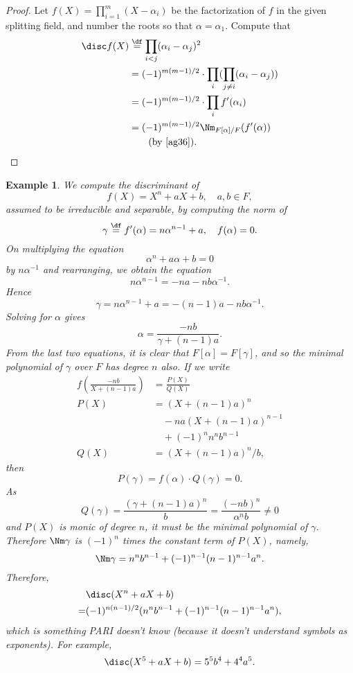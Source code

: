 \documentclass[a4paper,11pt,final,openany]{memoir}
\newtheorem{example}[X]{Example}
\theoremstyle{nonumberplain}
\newtheorem{proof}{Proof.}
\begin{document}
\begin{proof}
Let $f(X)=\prod_{i=1}^{m}(X-\alpha_{i})$ be the factorization of $f$ in the
given splitting field, and number the roots so that $\alpha=\alpha_{1}$.
Compute that
\begin{align*}
\disc f(X)  &  \overset{\df}{=}\prod_{i<j}(\alpha_{i}%
-\alpha_{j})^{2}\\
&  =(-1)^{m(m-1)/2}\cdot\prod_{i}(\prod_{j\neq i}(\alpha_{i}-\alpha_{j}))\\
&  =(-1)^{m(m-1)/2}\cdot\prod_{i}f^{\prime}(\alpha_{i})\\
&  =(-1)^{m(m-1)/2}\Nm_{F[\alpha]/F}(f^{\prime}(\alpha))\\
&\qquad\text{(by
\ref{ag36})}.
\end{align*}

\end{proof}

\begin{example}
\label{ag39}We compute the discriminant of
\[
f(X)=X^{n}+aX+b,\quad a,b\in F,
\]
assumed to be irreducible and separable, by computing the norm of
\[
\gamma\overset{\df}{=}f^{\prime}(\alpha)=n\alpha
^{n-1}+a,\quad f(\alpha)=0\text{.}%
\]
On multiplying the equation
\[
\alpha^{n}+a\alpha+b=0
\]
by $n\alpha^{-1}$ and rearranging, we obtain the equation
\[
n\alpha^{n-1}=-na-nb\alpha^{-1}.
\]
Hence
\[
\gamma=n\alpha^{n-1}+a=-(n-1)a-nb\alpha^{-1}.
\]
Solving for $\alpha$ gives
\[
\alpha=\frac{-nb}{\gamma+(n-1)a}.
\]
From the last two equations, it is clear that $F[\alpha]=F[\gamma]$, and so
the minimal polynomial of $\gamma$ over $F$ has degree $n$ also. If we write
\begin{align*}
f\left(  \frac{-nb}{X+(n-1)a}\right)   &  =\frac{P(X)}{Q(X)}\\
P(X)  &  =(X+(n-1)a)^{n}\\
   &\quad -na(X+(n-1)a)^{n-1}\\
   &\quad +(-1)^{n}n^{n}b^{n-1}\\
Q(X)  &  =(X+(n-1)a)^{n}/b,
\end{align*}
then
\[
P(\gamma)=f(\alpha)\cdot Q(\gamma)=0.
\]
As%
\[
Q(\gamma)=\frac{(\gamma+(n-1)a)^{n}}{b}=\frac{(-nb)^{n}}{\alpha^{n}b}\neq0
\]
and $P(X)$ is monic of degree $n$, it must be the minimal polynomial of
$\gamma$. Therefore $\Nm\gamma$ is $(-1)^{n}$ times the constant term of
$P(X)$, namely,
\[
\Nm\gamma=n^{n}b^{n-1}+(-1)^{n-1}(n-1)^{n-1}a^{n}.
\]
Therefore,
\begin{align*}
&\disc(X^{n}+aX+b)\\
=&(-1)^{n(n-1)/2}(n^{n}b^{n-1}+(-1)^{n-1}(n-1)^{n-1}a^{n}),
\end{align*}
which is something PARI%
doesn't know (because it doesn't understand symbols as exponents). For
example,
\[
\disc(X^{5}+aX+b)=5^{5}b^{4}+4^{4}a^{5}.
\]

\end{example}
\end{document}
